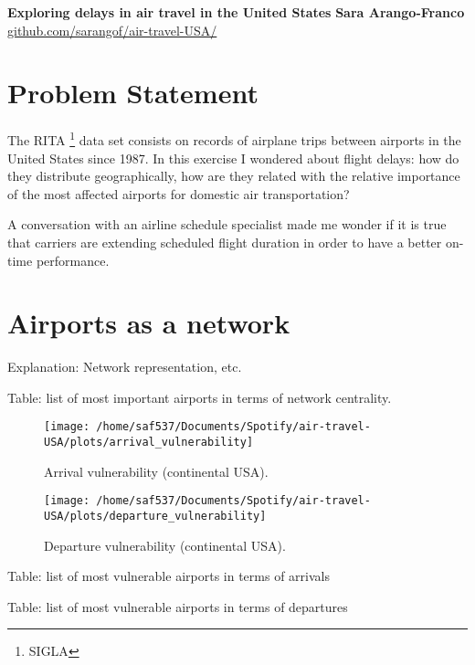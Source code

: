 \documentclass[a4paper, 11pt]{article}
\begin{document}
\noindent
\large\textbf{Exploring delays in air travel in the United States} \hfill \textbf{Sara Arango-Franco} \\
\normalsize \url{github.com/sarangof/air-travel-USA/} 

\section*{Problem Statement}
The RITA \footnote{SIGLA} data set consists on records of airplane trips between airports in the United States since 1987. In this exercise I wondered about flight delays: how do they distribute geographically, how are they related with the relative importance of the most affected airports for domestic air transportation? 

A conversation with an airline schedule specialist made me wonder if it is true that carriers are extending scheduled flight duration in order to have a better on-time performance. 

\section*{Airports as a network}


Explanation: Network representation, etc.

Table: list of most important airports in terms of network centrality.


\begin{figure}[!ht]
  \caption{Arrival vulnerability (continental USA).}
  \label{m_days}
  \centering
    \texttt{[image: /home/saf537/Documents/Spotify/air-travel-USA/plots/arrival\_vulnerability]}
\end{figure}

\begin{figure}[!ht]
  \caption{Departure vulnerability (continental USA).}
  \label{m_days}
  \centering
    \texttt{[image: /home/saf537/Documents/Spotify/air-travel-USA/plots/departure\_vulnerability]}
\end{figure}


Table: list of most vulnerable airports in terms of arrivals

Table: list of most vulnerable airports in terms of departures

\end{document}
